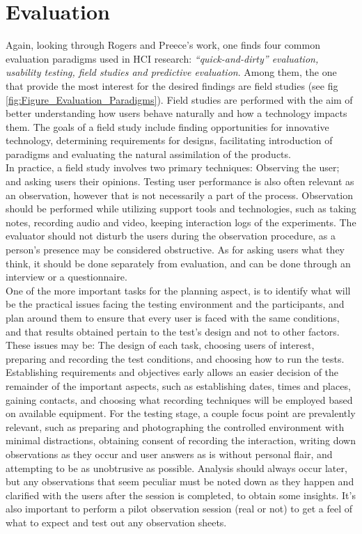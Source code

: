 \section{Evaluation} \label{sec:hci_}
    Again, looking through Rogers and Preece’s work\cite{preeceBook}, one finds four common evaluation paradigms used in HCI research: \emph{“quick-and-dirty” evaluation, usability testing, field studies and predictive evaluation}. Among them, the one that provide the most interest for the desired findings are field studies (see fig \ref{fig:Figure_Evaluation_Paradigms}). Field studies are performed with the aim of better understanding how users behave naturally and how a technology impacts them. The goals of a field study include finding opportunities for innovative technology, determining requirements for designs, facilitating introduction of paradigms and evaluating the natural assimilation of the products.\\
    In practice, a field study involves two primary techniques: Observing the user; and asking users their opinions. Testing user performance is also often relevant as an observation, however that is not necessarily a part of the process. Observation should be performed while utilizing support tools and technologies, such as taking notes, recording audio and video, keeping interaction logs of the experiments. The evaluator should not disturb the users during the observation procedure, as a person’s presence may be considered obstructive. As for asking users what they think, it should be done separately from evaluation, and can be done through an interview or a questionnaire.\\
    One of the more important tasks for the planning aspect, is to identify what will be the practical issues facing the testing environment and the participants, and plan around them to ensure that every user is faced with the same conditions, and that results obtained pertain to the test’s design and not to other factors. These issues may be: The design of each task, choosing users of interest, preparing and recording the test conditions, and choosing how to run the tests. Establishing requirements and objectives early allows an easier decision of the remainder of the important aspects, such as establishing dates, times and places, gaining contacts, and choosing what recording techniques will be employed based on available equipment. For the testing stage, a couple focus point are prevalently relevant, such as preparing and photographing the controlled environment with minimal distractions, obtaining consent of recording the interaction, writing down observations as they occur and user answers as is without personal flair, and attempting to be as unobtrusive as possible. Analysis should always occur later, but any observations that seem peculiar must be noted down as they happen and clarified with the users after the session is completed, to obtain some insights. It’s also important to perform a pilot observation session (real or not) to get a feel of what to expect and test out any observation sheets.\\
